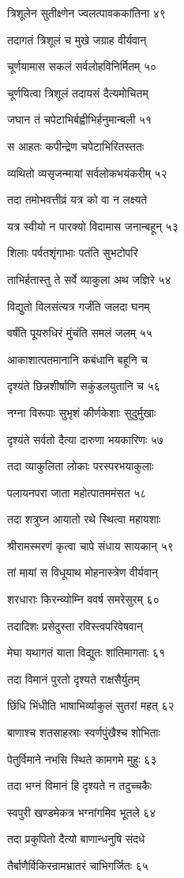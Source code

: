 त्रिशूलेन सुतीक्ष्णेन ज्वलत्पावककांतिना ४९

तदागतं त्रिशूलं च मुखे जग्राह वीर्यवान्

चूर्णयामास सकलं सर्वलोहविनिर्मितम् ५०

चूर्णयित्वा त्रिशूलं तदायसं दैत्यमोचितम्

जघान तं चपेटाभिर्बह्वीभिर्हनुमान्बली ५१

स आहतः कपीन्द्रेण चपेटाभिरितस्ततः

व्यथितो व्यसृजन्मायां सर्वलोकभयंकरीम् ५२

तदा तमोभवत्तीव्रं यत्र को वा न लक्ष्यते

यत्र स्वीयो न पारक्यो विदामास जनान्बहून् ५३

शिलाः पर्वतशृंगाभाः पतंति सुभटोपरि

ताभिर्हतास्तु ते सर्वे व्याकुला अथ जज्ञिरे ५४

विद्युतो विलसंत्यत्र गर्जंति जलदा घनम्

वर्षंति पूयरुधिरं मुंचंति समलं जलम् ५५

आकाशात्पतमानानि कबंधानि बहूनि च

दृश्यंते छिन्नशीर्षाणि सकुंडलयुतानि च ५६

नग्ना विरूपाः सुभृशं कीर्णकेशाः सुदुर्मुखाः

दृश्यंते सर्वतो दैत्या दारुणा भयकारिणः ५७

तदा व्याकुलिता लोकाः परस्परभयाकुलाः

पलायनपरा जाता महोत्पातममंसत ५८

तदा शत्रुघ्न आयातो रथे स्थित्वा महायशाः

श्रीरामस्मरणं कृत्वा चापे संधाय सायकान् ५९

तां मायां स विधूयाथ मोहनास्त्रेण वीर्यवान्

शरधाराः किरन्व्योम्नि ववर्ष समरेसुरम् ६०

तदादिशः प्रसेदुस्ता रविस्त्वपरिवेषवान्

मेघा यथागतं याता विद्युतः शांतिमागताः ६१

तदा विमानं पुरतो दृश्यते राक्षसैर्युतम्

छिंधि भिंधीति भाषाभिर्व्याकुलं सुतरां महत् ६२

बाणाश्च शतसाहस्राः स्वर्णपुंखैश्च शोभिताः

पेतुर्विमाने नभसि स्थिते कामगमे मुहुः ६३

तदा भग्नं विमानं हि दृश्यते न तदुच्चकैः

स्वपुरी खण्डमेकत्र भग्नांगमिव भूतले ६४

तदा प्रकुपितो दैत्यो बाणान्धनुषि संदधे

तैर्बाणैर्विकिरन्रामभ्रातरं चाभिगर्जितः ६५

